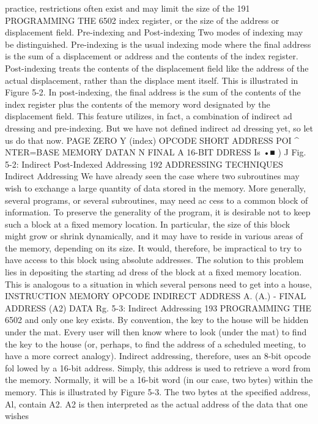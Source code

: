 \documentclass{book}
\begin{document}
practice, restrictions often exist and may limit the size of the
191
PROGRAMMING THE 6502
index register, or the size of the address or displacement field.
Pre-indexing and Post-indexing
Two modes of indexing may be distinguished. Pre-indexing is
the usual indexing mode where the final address is the sum of a
displacement or address and the contents of the index register.
Post-indexing treats the contents of the displacement field like
the address of the actual displacement, rather than the displace
ment itself. This is illustrated in Figure 5-2. In post-indexing, the
final address is the sum of the contents of the index register plus
the contents of the memory word designated by the displacement
field. This feature utilizes, in fact, a combination of indirect ad
dressing and pre-indexing. But we have not defined indirect ad
dressing yet, so let us do that now.
PAGE ZERO Y (index)
OPCODE
SHORT ADDRESS
POI
^
NTER=BASE
MEMORY
DATAN
N
FINAL
A
16-BIT
DDRESS
Is
•■ )
J
Fig. 5-2: Indirect Post-Indexed Addressing
192
ADDRESSING TECHNIQUES
Indirect Addressing
We have already seen the case where two subroutines may wish
to exchange a large quantity of data stored in the memory. More
generally, several programs, or several subroutines, may need ac
cess to a common block of information. To preserve the generality
of the program, it is desirable not to keep such a block at a fixed
memory location. In particular, the size of this block might grow
or shrink dynamically, and it may have to reside in various
areas of the memory, depending on its size. It would, therefore,
be impractical to try to have access to this block using absolute
addresses.
The solution to this problem lies in depositing the starting ad
dress of the block at a fixed memory location. This is analogous
to a situation in which several persons need to get into a house,
INSTRUCTION MEMORY
OPCODE
INDIRECT
ADDRESS A.
(A.)
-
FINAL
ADDRESS (A2)
DATA
Rg. 5-3: Indirect Addressing
193
PROGRAMMING THE 6502
and only one key exists. By convention, the key to the house
will be hidden under the mat. Every user will then know where to
look (under the mat) to find the key to the house (or, perhaps, to
find the address of a scheduled meeting, to have a more correct
analogy). Indirect addressing, therefore, uses an 8-bit opcode fol
lowed by a 16-bit address. Simply, this address is used to retrieve
a word from the memory. Normally, it will be a 16-bit word (in our
case, two bytes) within the memory. This is illustrated by Figure
5-3. The two bytes at the specified address, Al, contain A2. A2 is
then interpreted as the actual address of the data that one wishes
\end{document}
